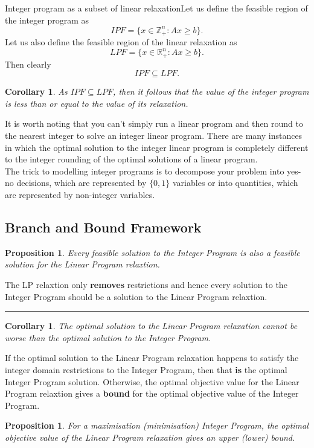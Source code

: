 \documentclass[twoside]{article}
\newtheorem{proposition}[theorem]{Proposition}
\newtheorem{corollary}[theorem]{Corollary}
\newenvironment{proof}{{\bf Proof:}}{\hfill\rule{2mm}{2mm}}
\begin{document}
\begin{theorem_exam}{Integer program as a subset of linear relaxation}{}Let us define the feasible region of the integer program as 
$$
IPF = \{x \in \mathbb{Z}_{+}^{n}: Ax \geq b\}.
$$
Let us also define the feasible region of the linear relaxation as 
$$
LPF = \{x \in \mathbb{R}_{+}^{n}: Ax \geq b\}.
$$
Then clearly 
$$
IPF \subseteq LPF.
$$
\end{theorem_exam}

\begin{corollary}As $IPF \subseteq LPF$, then it follows that the value of the integer program is less than or equal to the value of its relaxation.
\end{corollary}

It is worth noting that you can't simply run a linear program and then round to the nearest integer to solve an integer linear program. There are many instances in which the optimal solution to the integer linear program is completely different to the integer rounding of the optimal solutions of a linear program.\\

The trick to modelling integer programs is to decompose your problem into yes-no decisions, which are represented by $\{0,1\}$ variables or into quantities, which are represented by non-integer variables.

\subsection{Branch and Bound Framework}

\begin{proposition}Every feasible solution to the Integer Program is also a feasible solution for the Linear Program relaxtion.
\end{proposition}

\begin{proof} The LP relaxtion only \textbf{removes} restrictions and hence every solution to the Integer Program should be a solution to the Linear Program relaxtion.
\end{proof}

\begin{corollary}The optimal solution to the Linear Program relaxation cannot be worse than the optimal solution to the Integer Program.
\end{corollary}

If the optimal solution to the Linear Program relaxation happens to satisfy the integer domain restrictions to the Integer Program, then that \textbf{is} the optimal Integer Program solution. Otherwise, the optimal objective value for the Linear Program relaxtion gives a \textbf{bound} for the optimal objective value of the Integer Program.\\
\begin{proposition}For a maximisation (minimisation) Integer Program, the optimal objective value of the Linear Program relaxation gives an upper (lower) bound.
\end{proposition}
\end{document}
